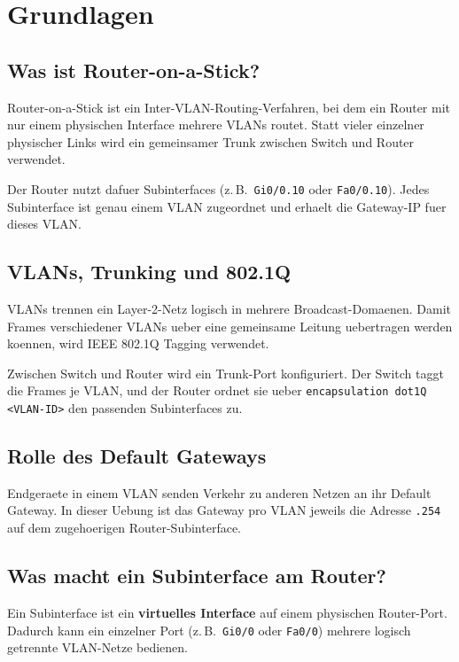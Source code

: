 \documentclass[11pt, oneside, numbers=noenddot]{scrbook}
\begin{document}

\cleardoublepage
{}
\tableofcontents
\clearpage
{}

\chapter{Grundlagen}
\section{Was ist Router-on-a-Stick?}
Router-on-a-Stick ist ein Inter-VLAN-Routing-Verfahren,  bei dem ein Router mit nur einem physischen Interface mehrere VLANs routet. Statt vieler einzelner physischer Links wird ein gemeinsamer Trunk zwischen Switch und Router verwendet.

Der Router nutzt dafuer Subinterfaces (z.\,B.\ \texttt{Gi0/0.10} oder \texttt{Fa0/0.10}). Jedes Subinterface ist genau einem VLAN zugeordnet und erhaelt die Gateway-IP fuer dieses VLAN.

\section{VLANs, Trunking und 802.1Q}
VLANs trennen ein Layer-2-Netz logisch in mehrere Broadcast-Domaenen. Damit Frames verschiedener VLANs ueber eine gemeinsame Leitung uebertragen werden koennen, wird IEEE 802.1Q Tagging verwendet.

Zwischen Switch und Router wird ein Trunk-Port konfiguriert. Der Switch taggt die Frames je VLAN, und der Router ordnet sie ueber \texttt{encapsulation dot1Q <VLAN-ID>} den passenden Subinterfaces zu.

\section{Rolle des Default Gateways}
Endgeraete in einem VLAN senden Verkehr zu anderen Netzen an ihr Default Gateway. In dieser Uebung ist das Gateway pro VLAN jeweils die Adresse \texttt{.254} auf dem zugehoerigen Router-Subinterface.

\section{Was macht ein Subinterface am Router?}
Ein Subinterface ist ein \textbf{virtuelles Interface} auf einem physischen Router-Port. Dadurch kann ein einzelner Port (z.\,B.\ \texttt{Gi0/0} oder \texttt{Fa0/0}) mehrere logisch getrennte VLAN-Netze bedienen.
\end{document}
